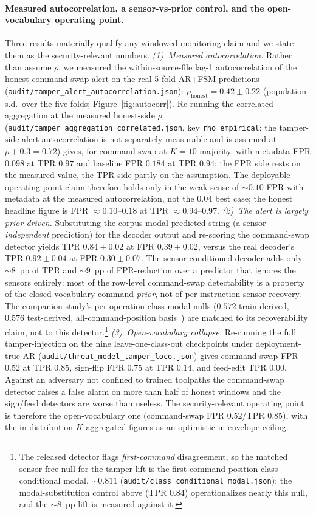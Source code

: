 \documentclass[sensors,article,submit,moreauthors,pdftex]{Definitions/mdpi}
\begin{document}
\paragraph{Measured autocorrelation, a sensor-vs-prior control, and the open-vocabulary operating point.} Three results materially qualify any windowed-monitoring claim and we state them as the security-relevant numbers. \emph{(1)~Measured autocorrelation.} Rather than assume $\rho$, we measured the within-source-file lag-1 autocorrelation of the honest command-swap alert on the real 5-fold AR+FSM predictions (\texttt{audit/tamper\_alert\_autocorrelation.json}): $\rho_{\text{honest}} = 0.42 \pm 0.22$ (population s.d.\ over the five folds; Figure~\ref{fig:autocorr}). Re-running the correlated aggregation at the measured honest-side $\rho$ (\texttt{audit/tamper\_aggregation\_correlated.json}, key \texttt{rho\_empirical}; the tamper-side alert autocorrelation is not separately measurable and is assumed at $\rho + 0.3 = 0.72$) gives, for command-swap at $K=10$ majority, with-metadata FPR $0.098$ at TPR $0.97$ and baseline FPR $0.184$ at TPR $0.94$; the FPR side rests on the measured value, the TPR side partly on the assumption. The deployable-operating-point claim therefore holds only in the weak sense of $\sim\!0.10$ FPR with metadata at the measured autocorrelation, not the $0.04$ best case; the honest headline figure is FPR $\approx 0.10$--$0.18$ at TPR $\approx 0.94$--$0.97$. \emph{(2)~The alert is largely prior-driven.} Substituting the corpus-modal predicted string (a sensor-\emph{independent} prediction) for the decoder output and re-scoring the command-swap detector yields TPR $0.84 \pm 0.02$ at FPR $0.39 \pm 0.02$, versus the real decoder's TPR $0.92 \pm 0.04$ at FPR $0.30 \pm 0.07$. The sensor-conditioned decoder adds only $\sim\!8$~pp of TPR and $\sim\!9$~pp of FPR-reduction over a predictor that ignores the sensors entirely: most of the row-level command-swap detectability is a property of the closed-vocabulary command \emph{prior}, not of per-instruction sensor recovery. The companion study's per-operation-class modal nulls ($0.572$ train-derived, $0.576$ test-derived, all-command-position basis~\cite{decoder_paper}) are matched to its recoverability claim, not to this detector.\footnote{The released detector flags \emph{first-command} disagreement, so the matched sensor-free null for the tamper lift is the first-command-position class-conditional modal, $\sim\!0.811$ (\texttt{audit/class\_conditional\_modal.json}); the modal-substitution control above (TPR $0.84$) operationalizes nearly this null, and the $\sim\!8$~pp lift is measured against it.} \emph{(3)~Open-vocabulary collapse.} Re-running the full tamper-injection on the nine leave-one-class-out checkpoints under deployment-true AR (\texttt{audit/threat\_model\_tamper\_loco.json}) gives command-swap FPR $0.52$ at TPR $0.85$, sign-flip FPR $0.75$ at TPR $0.14$, and feed-edit TPR $0.00$. Against an adversary not confined to trained toolpaths the command-swap detector raises a false alarm on more than half of honest windows and the sign/feed detectors are worse than useless. The security-relevant operating point is therefore the open-vocabulary one (command-swap FPR $0.52$/TPR $0.85$), with the in-distribution $K$-aggregated figures as an optimistic in-envelope ceiling.
\end{document}
